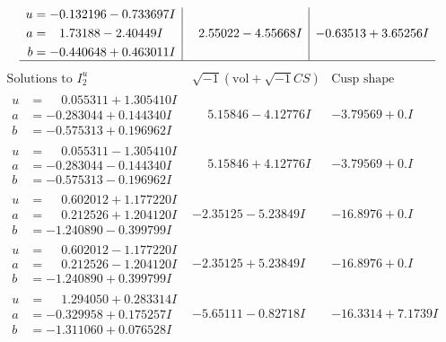 \documentclass[1p]{elsarticle_modified}
\theoremstyle{definition}
\newcommand{\I}{\sqrt{-1}}
\begin{document}
$$\begin{array}{c|c|c}
\begin{aligned}
u &= -0.132196 - 0.733697 I \\
a &= \phantom{-}1.73188 - 2.40449 I \\
b &= -0.440648 + 0.463011 I\end{aligned}
 & \phantom{-}2.55022 - 4.55668 I & -0.63513 + 3.65256 I\\
 \hline 
 \end{array}$$\newpage$$\begin{array}{c|c|c}  
\text{Solutions to }I^u_{2}& \I (\text{vol} + \sqrt{-1}CS) & \text{Cusp shape}\\
 \hline 
\begin{aligned}
u &= \phantom{-}0.055311 + 1.305410 I \\
a &= -0.283044 + 0.144340 I \\
b &= -0.575313 + 0.196962 I\end{aligned}
 & \phantom{-}5.15846 - 4.12776 I & -3.79569 + 0. I\phantom{ +0.000000I} \\ \hline\begin{aligned}
u &= \phantom{-}0.055311 - 1.305410 I \\
a &= -0.283044 - 0.144340 I \\
b &= -0.575313 - 0.196962 I\end{aligned}
 & \phantom{-}5.15846 + 4.12776 I & -3.79569 + 0. I\phantom{ +0.000000I} \\ \hline\begin{aligned}
u &= \phantom{-}0.602012 + 1.177220 I \\
a &= \phantom{-}0.212526 + 1.204120 I \\
b &= -1.240890 - 0.399799 I\end{aligned}
 & -2.35125 - 5.23849 I & -16.8976 + 0. I\phantom{ +0.000000I} \\ \hline\begin{aligned}
u &= \phantom{-}0.602012 - 1.177220 I \\
a &= \phantom{-}0.212526 - 1.204120 I \\
b &= -1.240890 + 0.399799 I\end{aligned}
 & -2.35125 + 5.23849 I & -16.8976 + 0. I\phantom{ +0.000000I} \\ \hline\begin{aligned}
u &= \phantom{-}1.294050 + 0.283314 I \\
a &= -0.329958 + 0.175257 I \\
b &= -1.311060 + 0.076528 I\end{aligned}
 & -5.65111 - 0.82718 I & -16.3314 + 7.1739 I \\ \hline\begin{aligned}

\end{aligned}
\end{array}$$
\end{document}
